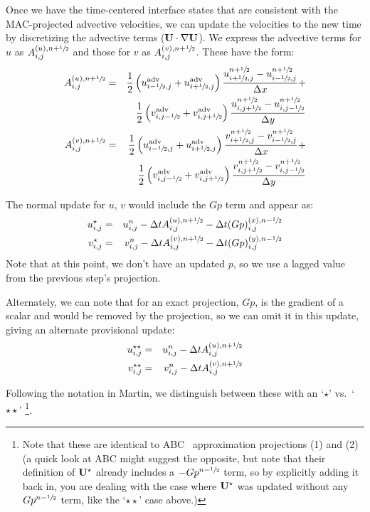 Once we have the time-centered interface states that are consistent with
the MAC-projected advective velocities, we can update the velocities to
the new time by discretizing the advective terms (${\bf U}\cdot \nabla {\bf U}$).
We express the advective terms for $u$ as $A^{(u),n+{\sfrac{1}{2}}}_{i,j}$ and
those for $v$ as $A^{(v),n+{\sfrac{1}{2}}}_{i,j}$.  These have the form:
\begin{eqnarray}
A^{(u),n+\myhalf}_{i,j} =   
   && \frac{1}{2}
     \left ( u^\mathrm{adv}_{i-\myhalf,j} + u^\mathrm{adv}_{i+\myhalf,j} \right )
     \frac{u^{n+\myhalf}_{i+\myhalf,j} - u^{n+\myhalf}_{i-\myhalf,j}}{\Delta x} + \nonumber \\
   && \frac{1}{2}
     \left ( v^\mathrm{adv}_{i,j-\myhalf} + v^\mathrm{adv}_{i,j+\myhalf} \right )
     \frac{u^{n+\myhalf}_{i,j+\myhalf} - u^{n+\myhalf}_{i,j-\myhalf}}{\Delta y} \\
%
A^{(v),n+\myhalf}_{i,j} = 
   && \frac{1}{2}
     \left ( u^\mathrm{adv}_{i-\myhalf,j} + u^\mathrm{adv}_{i+\myhalf,j} \right )
     \frac{v^{n+\myhalf}_{i+\myhalf,j} - v^{n+\myhalf}_{i-\myhalf,j}}{\Delta x} \nonumber +\\
   && \frac{1}{2}
     \left ( v^\mathrm{adv}_{i,j-\myhalf} + v^\mathrm{adv}_{i,j+\myhalf} \right )
     \frac{v^{n+\myhalf}_{i,j+\myhalf} - v^{n+\myhalf}_{i,j-\myhalf}}{\Delta y}
\end{eqnarray}

The normal update for $u$, $v$ would include the $Gp$ term and appear
as:
\begin{eqnarray}
u^{\star}_{i,j} &=& u^n_{i,j} - \Delta t A^{(u),n+{\sfrac{1}{2}}}_{i,j} - \Delta t (G p)^{(x),n-{\sfrac{1}{2}}}_{i,j} \\
v^{\star}_{i,j} &=& v^n_{i,j} - \Delta t A^{(v),n+{\sfrac{1}{2}}}_{i,j} - \Delta t (G p)^{(y),n-{\sfrac{1}{2}}}_{i,j} 
\end{eqnarray}
Note that at this point, we don't have an updated $p$, so we use a lagged
value from the previous step's projection.

Alternately, we can note that for an exact projection, $Gp$, is the gradient
of a scalar and would be removed by the projection, so we can omit it in
this update, giving an alternate provisional update:
\begin{eqnarray}
u^{\star\star}_{i,j} &=& u^n_{i,j} - \Delta t A^{(u),n+{\sfrac{1}{2}}}_{i,j}  \\
v^{\star\star}_{i,j} &=& v^n_{i,j} - \Delta t A^{(v),n+{\sfrac{1}{2}}}_{i,j}  
\end{eqnarray}


Following the notation in Martin, we distinguish between these with
an `$\star$' vs.\ `$\star\star$' \footnote{Note that these are identical to
ABC~\cite{ABC} approximation projections (1) and (2) (a quick look at ABC might
suggest the opposite, but note that their definition of ${\bf U}^\star$
already includes a $-Gp^{n-{\sfrac{1}{2}}}$ term, so by explicitly adding it back
in, you are dealing with the case where ${\bf U}^\star$ was updated without
any $Gp^{n-{\sfrac{1}{2}}}$ term, like the `$\star\star$' case above.)}.


